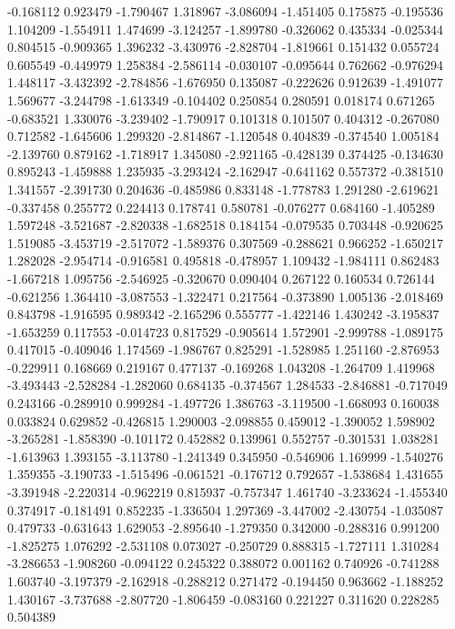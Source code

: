 -0.168112
0.923479
-1.790467
1.318967
-3.086094
-1.451405
0.175875
-0.195536
1.104209
-1.554911
1.474699
-3.124257
-1.899780
-0.326062
0.435334
-0.025344
0.804515
-0.909365
1.396232
-3.430976
-2.828704
-1.819661
0.151432
0.055724
0.605549
-0.449979
1.258384
-2.586114
-0.030107
-0.095644
0.762662
-0.976294
1.448117
-3.432392
-2.784856
-1.676950
0.135087
-0.222626
0.912639
-1.491077
1.569677
-3.244798
-1.613349
-0.104402
0.250854
0.280591
0.018174
0.671265
-0.683521
1.330076
-3.239402
-1.790917
0.101318
0.101507
0.404312
-0.267080
0.712582
-1.645606
1.299320
-2.814867
-1.120548
0.404839
-0.374540
1.005184
-2.139760
0.879162
-1.718917
1.345080
-2.921165
-0.428139
0.374425
-0.134630
0.895243
-1.459888
1.235935
-3.293424
-2.162947
-0.641162
0.557372
-0.381510
1.341557
-2.391730
0.204636
-0.485986
0.833148
-1.778783
1.291280
-2.619621
-0.337458
0.255772
0.224413
0.178741
0.580781
-0.076277
0.684160
-1.405289
1.597248
-3.521687
-2.820338
-1.682518
0.184154
-0.079535
0.703448
-0.920625
1.519085
-3.453719
-2.517072
-1.589376
0.307569
-0.288621
0.966252
-1.650217
1.282028
-2.954714
-0.916581
0.495818
-0.478957
1.109432
-1.984111
0.862483
-1.667218
1.095756
-2.546925
-0.320670
0.090404
0.267122
0.160534
0.726144
-0.621256
1.364410
-3.087553
-1.322471
0.217564
-0.373890
1.005136
-2.018469
0.843798
-1.916595
0.989342
-2.165296
0.555777
-1.422146
1.430242
-3.195837
-1.653259
0.117553
-0.014723
0.817529
-0.905614
1.572901
-2.999788
-1.089175
0.417015
-0.409046
1.174569
-1.986767
0.825291
-1.528985
1.251160
-2.876953
-0.229911
0.168669
0.219167
0.477137
-0.169268
1.043208
-1.264709
1.419968
-3.493443
-2.528284
-1.282060
0.684135
-0.374567
1.284533
-2.846881
-0.717049
0.243166
-0.289910
0.999284
-1.497726
1.386763
-3.119500
-1.668093
0.160038
0.033824
0.629852
-0.426815
1.290003
-2.098855
0.459012
-1.390052
1.598902
-3.265281
-1.858390
-0.101172
0.452882
0.139961
0.552757
-0.301531
1.038281
-1.613963
1.393155
-3.113780
-1.241349
0.345950
-0.546906
1.169999
-1.540276
1.359355
-3.190733
-1.515496
-0.061521
-0.176712
0.792657
-1.538684
1.431655
-3.391948
-2.220314
-0.962219
0.815937
-0.757347
1.461740
-3.233624
-1.455340
0.374917
-0.181491
0.852235
-1.336504
1.297369
-3.447002
-2.430754
-1.035087
0.479733
-0.631643
1.629053
-2.895640
-1.279350
0.342000
-0.288316
0.991200
-1.825275
1.076292
-2.531108
0.073027
-0.250729
0.888315
-1.727111
1.310284
-3.286653
-1.908260
-0.094122
0.245322
0.388072
0.001162
0.740926
-0.741288
1.603740
-3.197379
-2.162918
-0.288212
0.271472
-0.194450
0.963662
-1.188252
1.430167
-3.737688
-2.807720
-1.806459
-0.083160
0.221227
0.311620
0.228285
0.504389
